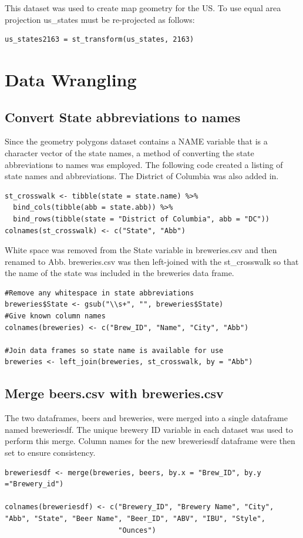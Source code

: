 \documentclass{report}
\begin{document}
This dataset was used to create map geometry for the US. To use equal area projection  us_states must be re-projected as follows:

\begin{verbatim}
us_states2163 = st_transform(us_states, 2163)
\end{verbatim}

\chapter{Data Wrangling}
\label{cha:wrangling}

\section{Convert State abbreviations to names}
\label{sec:abb}
Since the geometry polygons dataset contains a NAME variable that is a character vector of the state names, a method of converting the state abbreviations to names was employed. The following code created a listing of state names and abbreviations. The District of Columbia was also added in.
\begin{verbatim}
st_crosswalk <- tibble(state = state.name) %>%
  bind_cols(tibble(abb = state.abb)) %>% 
  bind_rows(tibble(state = "District of Columbia", abb = "DC"))
colnames(st_crosswalk) <- c("State", "Abb")
\end{verbatim}

White space was removed from the State variable in breweries.csv and then renamed to Abb.  breweries.csv was then left-joined with the st_crosswalk so that the name of the state was included in the breweries data frame.
\begin{verbatim}
#Remove any whitespace in state abbreviations
breweries$State <- gsub("\\s+", "", breweries$State)
#Give known column names
colnames(breweries) <- c("Brew_ID", "Name", "City", "Abb")

#Join data frames so state name is available for use
breweries <- left_join(breweries, st_crosswalk, by = "Abb")
\end{verbatim}

\section{Merge beers.csv with breweries.csv}
\label{sec:merge}

The two dataframes, beers and breweries, were merged into a single dataframe named breweriesdf. The unique brewery ID variable in each dataset was used to perform this merge. Column names for the new breweriesdf dataframe were then set to ensure consistency.   
\begin{verbatim}
breweriesdf <- merge(breweries, beers, by.x = "Brew_ID", by.y ="Brewery_id")

colnames(breweriesdf) <- c("Brewery_ID", "Brewery Name", "City", "Abb", "State", "Beer Name", "Beer_ID", "ABV", "IBU", "Style",
                           "Ounces")
\end{verbatim}
\end{document}
